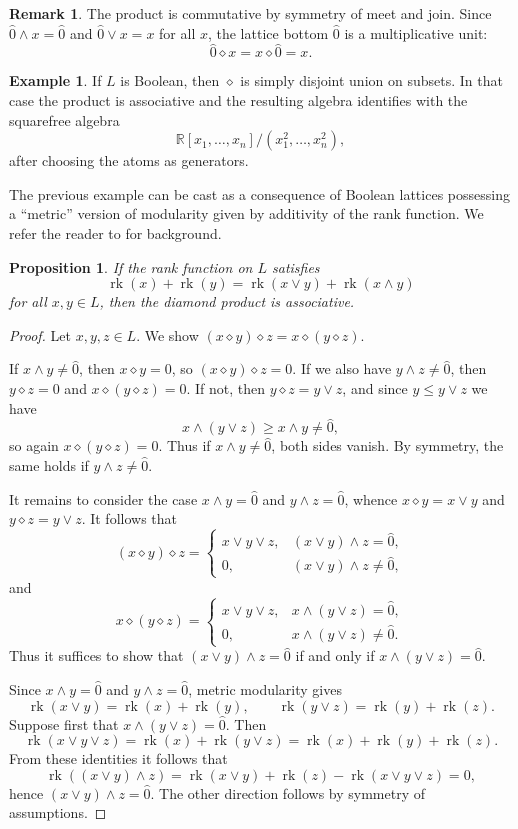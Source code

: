 \documentclass[11pt]{amsart}
\newtheorem{prop}[thm]{Proposition}
\theoremstyle{definition}
\newtheorem{remark}[thm]{Remark}
\newtheorem{example}[thm]{Example}
\DeclareMathOperator{\rk}{rk}
\newcommand{\R}{\mathbb{R}}
\newcommand{\zero}{\hat{0}}
\begin{document}
\begin{remark}
The product is commutative by symmetry of meet and join.  Since $\zero\wedge x=\zero$ and $\zero\vee x=x$ for all $x$, the lattice bottom $\zero$ is a multiplicative unit:
\[
    \zero\diamond x=x\diamond \zero=x.
\]
\end{remark}

\begin{example}
If $L$ is Boolean, then $\diamond$ is simply disjoint union on subsets.  In that case the product is associative and the resulting algebra identifies with the squarefree algebra
\[
    \R[x_1,\dots,x_n]/(x_1^2,\dots,x_n^2),
\]
after choosing the atoms as generators.  
\end{example}

The previous example can be cast as a consequence of Boolean lattices possessing a ``metric'' version of modularity given by additivity of the rank function. We refer the reader to \cite{CMS} for background.

\begin{prop}
    If the rank function on $L$ satisfies
    \[
    \rk(x) + \rk(y) = \rk(x\vee y) + \rk(x\wedge y)
    \]
    for all $x,y\in L$, then the diamond product is associative.
\end{prop}

\begin{proof}
Let $x,y,z\in L$. We show $(x\diamond y)\diamond z = x\diamond (y\diamond z)$.

If $x\wedge y\neq \hat 0$, then $x\diamond y=0$, so $(x\diamond y)\diamond z=0$.
If we also have $y\wedge z\neq \hat 0$, then $y\diamond z=0$ and
$x\diamond (y\diamond z)=0$. If not, then
$y\diamond z=y\vee z$, and since $y\le y\vee z$ we have
\[
x\wedge (y\vee z)\ge x\wedge y\neq \hat 0,
\]
so again $x\diamond (y\diamond z)=0$. Thus if $x\wedge y\neq \hat 0$, both sides vanish. By symmetry, the same holds if $y\wedge z\neq \hat 0$.

It remains to consider the case $x\wedge y=\hat 0$ and $y\wedge z=\hat 0$, whence $x\diamond y=x\vee y$ and $y\diamond z=y\vee z$.
It follows that
\[
(x\diamond y)\diamond z=
\begin{cases}
x\vee y\vee z,& (x\vee y)\wedge z=\hat 0,\\
0,& (x\vee y)\wedge z\neq \hat 0,
\end{cases}
\]
and
\[
x\diamond (y\diamond z)=
\begin{cases}
x\vee y\vee z,& x\wedge (y\vee z)=\hat 0,\\
0,& x\wedge (y\vee z)\neq \hat 0.
\end{cases}
\]
Thus it suffices to show that $(x\vee y)\wedge z=\hat 0$ if and only if $x\wedge (y\vee z)=\hat 0$.


Since $x\wedge y=\hat 0$ and $y\wedge z=\hat 0$, metric modularity gives
\[
\rk(x\vee y)= \rk(x)+\rk(y),
\qquad
\rk(y\vee z)=\rk(y)+\rk(z).
\]
Suppose first that $x\wedge (y\vee z)=\hat 0$. Then
\[
\rk(x\vee y\vee z)=\rk(x)+\rk(y\vee z) = \rk(x)+\rk(y)+\rk(z).
\]
From these identities it follows that
\[
\rk((x\vee y)\wedge z)
=
\rk(x\vee y)+\rk(z)-\rk(x\vee y\vee z)=0,
\]
hence $(x\vee y)\wedge z=\hat 0$. The other direction follows by symmetry of assumptions. \qedhere
\end{proof}
\end{document}
